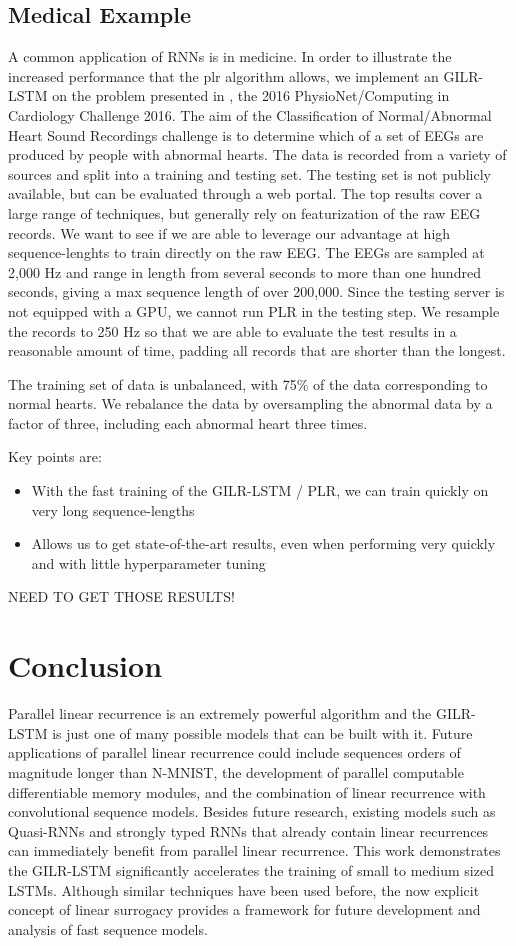 \documentclass{article}
\begin{document}
\subsection{Medical Example}
A common application of RNNs is in medicine. In order to illustrate the
increased performance that the plr algorithm allows, we implement an GILR-LSTM
on the problem presented in , the 2016 PhysioNet/Computing in
Cardiology Challenge 2016.  The aim of the Classification of Normal/Abnormal
Heart Sound Recordings challenge is to determine which of a set of EEGs are
produced by people with abnormal hearts.  The data is recorded from a variety of
sources and split into a training and testing set. The testing set is not
publicly available, but can be evaluated through a web portal. The top results
cover a large range of techniques, but generally rely on featurization of the
raw EEG records. We want to see if we are able to leverage our advantage at high
sequence-lenghts to train directly on the raw EEG. The EEGs are sampled at 2,000
Hz and range in length from several seconds to more than one hundred seconds,
giving a max sequence length of over 200,000. Since the testing server is not
equipped with a GPU, we cannot run PLR in the testing step. We resample the
records to 250 Hz so that we are able to evaluate the test results in a
reasonable amount of time, padding all records that are shorter than the longest.


The training set of data is unbalanced, with 75\% of the data corresponding to
normal hearts. We rebalance the data by oversampling the abnormal data by a factor
of three, including each abnormal heart three times. 

Key points are:
\begin{itemize}
\item{With the fast training of the GILR-LSTM / PLR, we can train quickly on very
    long sequence-lengths}
\item{Allows us to get state-of-the-art results, even when performing very quickly
    and with little hyperparameter tuning}
\end{itemize}

NEED TO GET THOSE RESULTS!

  
\section{Conclusion}
Parallel linear recurrence is an extremely powerful algorithm and the GILR-LSTM is just one
of many possible models that can be built with it. Future applications of parallel linear recurrence could include sequences orders of magnitude longer than N-MNIST, the development of parallel computable differentiable memory modules, and the combination of linear recurrence with convolutional sequence models. Besides future research, existing models such as Quasi-RNNs and strongly typed RNNs that already contain linear recurrences can immediately benefit from parallel linear recurrence. This work demonstrates the GILR-LSTM significantly accelerates the training of small to medium sized LSTMs. Although similar techniques have been used before, the now explicit concept of linear surrogacy provides a framework for future development and analysis of fast sequence models.
\end{document}
